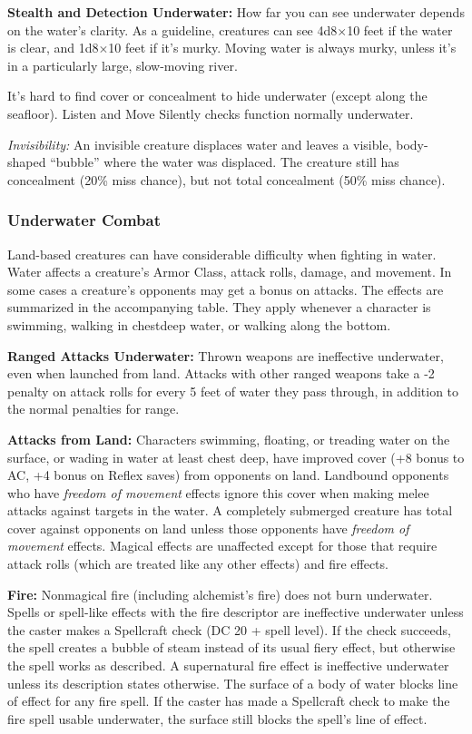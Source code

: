 \documentclass{article}
\begin{document}
\textbf{Stealth and Detection Underwater: }How far you can see underwater depends 
on the water's clarity. As a guideline, creatures can see 4d8\ensuremath{\times}10 
feet if the water is clear, and 1d8\ensuremath{\times}10 feet if it's murky. Moving 
water is always murky, unless it's in a particularly large, slow-moving river.

It's hard to find cover or concealment to hide underwater (except along the seafloor). 
Listen and Move Silently checks function normally underwater.

\textit{Invisibility: }An invisible creature displaces water and leaves a visible, 
body-shaped ``bubble'' where the water was displaced. The creature still has concealment 
(20\% miss chance), but not total concealment (50\% miss chance).

\subsubsection*{\textbf{Underwater Combat}}

Land-based creatures can have considerable difficulty when fighting in water. Water 
affects a creature's Armor Class, attack rolls, damage, and movement. In some cases 
a creature's opponents may get a bonus on attacks. The effects are summarized in 
the accompanying table. They apply whenever a character is swimming, walking in 
chestdeep water, or walking along the bottom. 

\textbf{Ranged Attacks Underwater:} Thrown weapons are ineffective underwater, 
even when launched from land. Attacks with other ranged weapons take a -2 penalty 
on attack rolls for every 5 feet of water they pass through, in addition to the 
normal penalties for range. 

\textbf{Attacks from Land:} Characters swimming, floating, or treading water on 
the surface, or wading in water at least chest deep, have improved cover (+8 bonus 
to AC, +4 bonus on Reflex saves) from opponents on land. Landbound opponents who 
have \textit{freedom of movement }effects ignore this cover when making melee attacks 
against targets in the water. A completely submerged creature has total cover against 
opponents on land unless those opponents have \textit{freedom of movement }effects. 
Magical effects are unaffected except for those that require attack rolls (which 
are treated like any other effects) and fire effects.

\textbf{Fire:} Nonmagical fire (including alchemist's fire) does not burn underwater. 
Spells or spell-like effects with the fire descriptor are ineffective underwater 
unless the caster makes a Spellcraft check (DC 20 + spell level). If the check 
succeeds, the spell creates a bubble of steam instead of its usual fiery effect, 
but otherwise the spell works as described. A supernatural fire effect is ineffective 
underwater unless its description states otherwise. The surface of a body of water 
blocks line of effect for any fire spell. If the caster has made a Spellcraft check 
to make the fire spell usable underwater, the surface still blocks the spell's 
line of effect.
\end{document}
